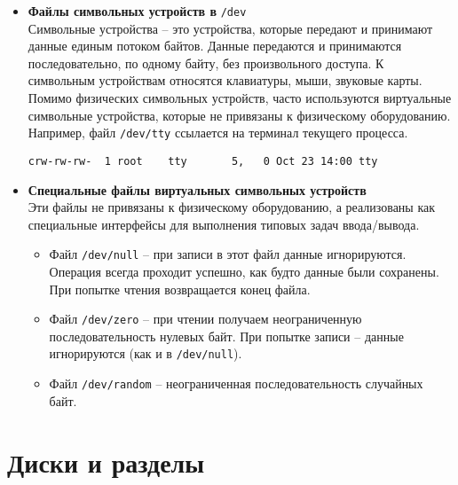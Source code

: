 \documentclass[10pt]{article}
\begin{document}
\begin{itemize}
\item \textbf{Файлы символьных устройств в }\texttt{/dev}\\
Символьные устройства -- это устройства, которые передают и принимают данные единым потоком байтов. Данные передаются и принимаются последовательно, по одному байту, без произвольного доступа. К символьным устройствам относятся клавиатуры, мыши, звуковые карты. Помимо физических символьных устройств, часто используются виртуальные символьные устройства, которые не привязаны к физическому оборудованию. Например, файл \texttt{/dev/tty} ссылается на терминал текущего процесса.
\begin{lstlisting}
crw-rw-rw-  1 root    tty       5,   0 Oct 23 14:00 tty
\end{lstlisting}


\item \textbf{Специальные файлы виртуальных символьных устройств}\\
Эти файлы не привязаны к физическому оборудованию, а реализованы как специальные интерфейсы для выполнения типовых задач ввода/вывода.
\vspace{-2mm}
\begin{itemize}
\item Файл \texttt{/dev/null} -- при записи в этот файл данные игнорируются. Операция всегда проходит успешно, как будто данные были сохранены. При попытке чтения возвращается конец файла.
\item Файл \texttt{/dev/zero} -- при чтении получаем неограниченную последовательность нулевых байт. При попытке записи -- данные игнорируются (как и в \texttt{/dev/null}).
\item Файл \texttt{/dev/random} -- неограниченная последовательность случайных байт.
\end{itemize}
\end{itemize}


\section*{Диски и разделы}
\end{document}
